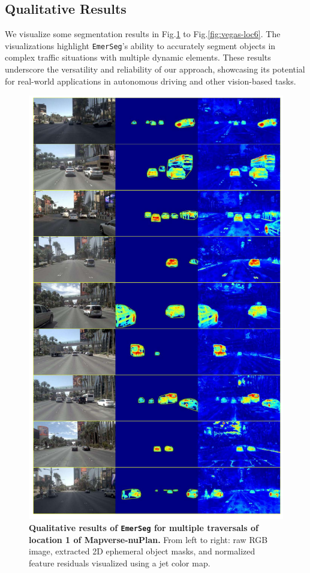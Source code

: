 \subsection{Qualitative Results}
We visualize some segmentation results in Fig.\ref{fig:vegas-loc1} to Fig.\ref{fig:vegas-loc6}. The visualizations highlight \texttt{EmerSeg}'s ability to accurately segment objects in complex traffic situations with multiple dynamic elements. These results underscore the versatility and reliability of our approach, showcasing its potential for real-world applications in autonomous driving and other vision-based tasks.

\begin{figure}[ht]
    \centering
    \includegraphics[width=0.88\linewidth]{figs_compressed/EmerSeg-loc1_compressed.pdf}
    \caption{\textbf{Qualitative results of \texttt{EmerSeg} for multiple traversals of location 1 of Mapverse-nuPlan.} From left to right: raw RGB image, extracted 2D ephemeral object masks, and normalized feature residuals visualized using a jet color map.}
    \label{fig:vegas-loc1}
\end{figure}

